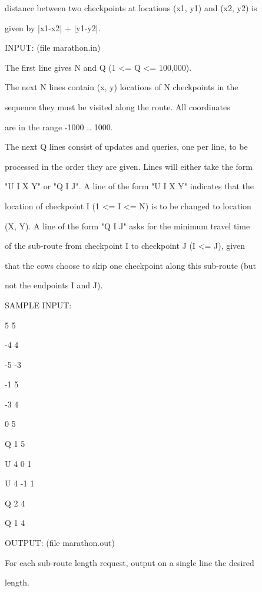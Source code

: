 \documentclass[12pt]{article}
\begin{document}
distance between two checkpoints at locations (x1, y1) and (x2, y2) is

given by |x1-x2| + |y1-y2|.



INPUT: (file marathon.in)



The first line gives N and Q (1 <= Q <= 100,000).



The next N lines contain (x, y) locations of N checkpoints in the

sequence they must be visited along the route.  All coordinates

are in the range -1000 .. 1000.



The next Q lines consist of updates and queries, one per line, to be

processed in the order they are given. Lines will either take the form

"U I X Y" or "Q I J".  A line of the form "U I X Y" indicates that the

location of checkpoint I (1 <= I <= N) is to be changed to location

(X, Y).  A line of the form "Q I J" asks for the minimum travel time

of the sub-route from checkpoint I to checkpoint J (I <= J), given

that the cows choose to skip one checkpoint along this sub-route (but

not the endpoints I and J).



SAMPLE INPUT:



5 5

-4 4

-5 -3

-1 5

-3 4

0 5

Q 1 5

U 4 0 1

U 4 -1 1

Q 2 4

Q 1 4



OUTPUT: (file marathon.out)



For each sub-route length request, output on a single line the desired

length.
\end{document}
